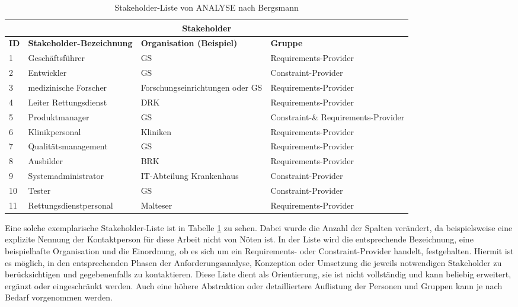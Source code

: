 \begin{table}[htb]
\centering
\setlength{\extrarowheight}{4pt}
\begin{tabular}{ |p{0.5cm} | p{4cm} | p{5.5cm} |p{4cm} |}
  \hline
	\multicolumn{4}{|c|}{\textbf{Stakeholder}} \\
  \hline
\textbf{ID} & \textbf{Stakeholder-Bezeichnung} 	& \textbf{Organisation (Beispiel)} & \textbf{Gruppe}
  \\\hline
  1			& Geschäftsführer 					& \gls{GS} 				& Requirements-Provider
  \\\hline  
  2			& Entwickler 						& \gls{GS} 				& Constraint-Provider
  \\\hline
  3			& medizinische Forscher 			& Forschungseinrichtungen oder \gls{GS} & Requirements-Provider
  \\\hline
  4			& Leiter Rettungsdienst				& \gls{DRK}				& Requirements-Provider
  \\\hline
  5			& Produktmanager 					& \gls{GS} 				& Constraint-\& Requirements-Provider
  \\\hline
  6			& Klinikpersonal					& Kliniken			& Requirements-Provider
  \\\hline
  7			& Qualitätsmanagement 				& \gls{GS} 				& Requirements-Provider
  \\\hline
  8			& Ausbilder 						& \gls{BRK}	 			& Requirements-Provider
  \\\hline
  9			& Systemadministrator 				& IT-Abteilung Krankenhaus				& Constraint-Provider
  \\\hline  
  10		& Tester 							& \gls{GS} 				& Constraint-Provider
  \\\hline
  11		& Rettungsdienstpersonal			& Malteser				& Requirements-Provider
  \\\hline
\end{tabular} 
  \caption[Stakeholder-Liste \acrlong*{ANALYSE}]{Stakeholder-Liste von \gls{ANALYSE} nach Bergsmann \cite[S. 85]{Bergsmann.2018}}
  \label{tbl:Stakeholder-Liste}
\end{table}

Eine solche exemplarische Stakeholder-Liste ist in Tabelle \ref{tbl:Stakeholder-Liste} zu sehen.
Dabei wurde die Anzahl der Spalten verändert, da beispielsweise eine explizite Nennung der Kontaktperson für diese Arbeit nicht von Nöten ist.
In der Liste wird die entsprechende Bezeichnung, eine beispielhafte Organisation und die Einordnung, ob es sich um ein Requirements- oder Constraint-Provider handelt, festgehalten.
Hiermit ist es möglich, in den entsprechenden Phasen der Anforderungsanalyse, Konzeption oder Umsetzung die jeweils notwendigen Stakeholder zu berücksichtigen und gegebenenfalls zu kontaktieren. 
Diese Liste dient als Orientierung, sie ist nicht vollständig und kann beliebig erweitert, ergänzt oder eingeschränkt werden.
Auch eine höhere Abstraktion oder detailliertere Auflistung der Personen und Gruppen kann je nach Bedarf vorgenommen werden. 

